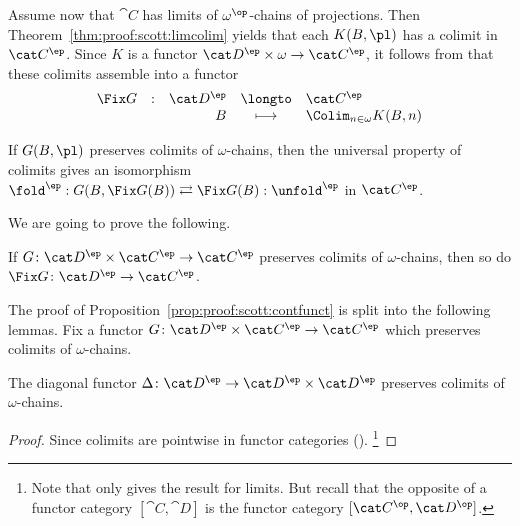 Assume now that $\cat C$ has limits of $\omega^\op$-chains
of projections.
Then Theorem~\ref{thm:proof:scott:limcolim}
yields that each $K(B,\pl)$ has a colimit in $\cat C^\ep$.
Since $K$ is a functor $\cat D^\ep \times \omega \to \cat C^\ep$,
it follows from \cite[Theorem V.3.1]{maclane98book}
that these colimits assemble into a functor
\[
\begin{array}{l l r c l}
  \Fix G
& :
& \cat D^\ep
& \longto
& \cat C^\ep
\\

&
& B
& \longmapsto
& \Colim_{n \in \omega} K(B,n)
\end{array}
\]

If $G(B,\pl)$ preserves colimits of $\omega$-chains,
then the universal property of colimits gives an isomorphism
\(
  \fold^\ep
  :
  G(B,\Fix G(B))
  \rightleftarrows
  \Fix G(B)
  :
  \unfold^\ep
\)
in $\cat C^\ep$.

We are going to prove the following.

\begin{proposition}
\label{prop:proof:scott:contfunct}
If $G \colon \cat D^\ep \times \cat C^\ep \to \cat C^\ep$
preserves colimits of $\omega$-chains,
then so do $\Fix G \colon \cat D^\ep \to \cat C^\ep$.
\end{proposition}

The proof of Proposition~\ref{prop:proof:scott:contfunct}
is split into the following lemmas.
Fix a functor $G \colon \cat D^\ep \times \cat C^\ep \to \cat C^\ep$
which preserves colimits of $\omega$-chains.

\begin{lemma}
\label{lem:proof:scott:contdiag}
The diagonal functor $\Delta \colon \cat D^\ep \to \cat D^\ep \times \cat D^\ep$
preserves colimits of $\omega$-chains.
\end{lemma}

\begin{proof}
Since colimits are pointwise in functor categories
(\cite[Corollary V.3]{maclane98book}).%
\footnote{Note that \cite[Corollary V.3]{maclane98book} only gives the result for limits.
But recall that the opposite of a functor category $[\cat C,\cat D]$
is the functor category $[\cat C^\op, \cat D^\op]$.}
\end{proof}

